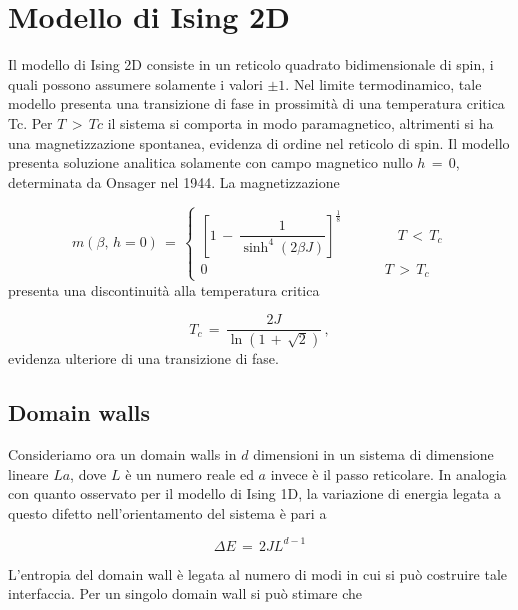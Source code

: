 \section{Modello di Ising 2D}

Il modello di Ising 2D consiste in un reticolo quadrato bidimensionale di spin, i quali possono assumere solamente i valori 
$\pm 1$. Nel limite termodinamico, tale modello presenta una transizione di fase in prossimità di una temperatura critica Tc.
Per $T\,>\,Tc$ il sistema si comporta in modo paramagnetico, altrimenti si ha una magnetizzazione spontanea, evidenza 
di ordine nel reticolo di spin. Il modello presenta soluzione analitica solamente con campo magnetico nullo $h\,=\,0$, 
determinata da Onsager nel 1944. La magnetizzazione 

\begin{equation}
    m\left(\beta,\,h=0\right)\,=\,
    \begin{cases}
    \left[1\,-\,\dfrac{1}{\sinh^4{\left(2\beta J\right)}}\right]^{\frac{1}{8}} \qquad \qquad T\,<\,T_c \\
    0 \qquad \qquad \qquad \qquad \qquad \qquad \,\,\,\, T\,>\,T_c
    \end{cases}
    \label{eq: magn_Onsager_1944}
\end{equation}
presenta una discontinuità alla temperatura critica 

\begin{equation}
    T_c\,=\,\frac{2J}{\ln{\left(1\,+\,\sqrt{2}\right)}}\,,
    \label{eq: tc_Ising2D_Ons}
\end{equation}
evidenza ulteriore di una transizione di fase.


\subsection{Domain walls}


Consideriamo ora un domain walls in $d$ dimensioni in un sistema di dimensione lineare $La$, dove $L$ è un numero reale ed $a$ invece 
è il passo reticolare. In analogia con quanto osservato per il modello di Ising 1D, la variazione di energia legata a questo difetto 
nell'orientamento del sistema è pari a 

\begin{equation}
    \Delta E\,=\,2JL^{d-1}
    \label{eq: ene_dw_IsingdD}
\end{equation}

L'entropia del domain wall è legata al numero di modi in cui si può costruire tale interfaccia. Per un singolo domain wall si può 
stimare che 

